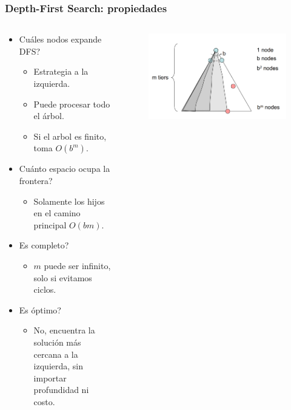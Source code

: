 \documentclass[10pt]{beamer}
\begin{document}
\begin{frame}
  \frametitle{Depth-First Search: propiedades}
  \begin{columns}
    \begin{column}{0.5\textwidth}
      \begin{itemize}
        \item Cuáles nodos expande DFS?
          \begin{itemize}
            \item Estrategia a la izquierda.
            \item Puede procesar todo el árbol.
            \item Si el arbol es finito, toma $O(b^m)$.
          \end{itemize}
        \item Cuánto espacio ocupa la frontera?
          \begin{itemize}
            \item Solamente los hijos en el camino principal $O(bm)$.
          \end{itemize}
        \item Es completo?
          \begin{itemize}
            \item $m$ puede ser infinito, solo si evitamos ciclos.
          \end{itemize}
        \item Es óptimo?
          \begin{itemize}
            \item No, encuentra la solución más cercana a la izquierda, sin 
            importar profundidad ni costo.
          \end{itemize}
      \end{itemize}
    \end{column}
    \begin{column}{0.5\textwidth}
      \begin{figure}[!h] 
        \centering
        \includegraphics[width=1\textwidth]{img/dfs2}
      \end{figure} 
    \end{column}
  \end{columns}
\end{frame}
\end{document}
